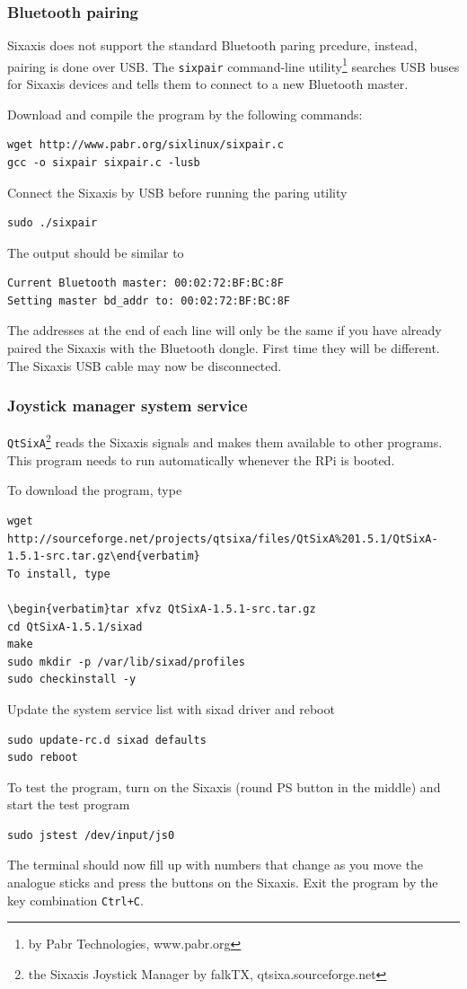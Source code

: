 \subsubsection{Bluetooth pairing}\label{par: Bluetooth-pairing}
Sixaxis does not support the standard Bluetooth paring prcedure, instead, pairing is done over USB. The \texttt{sixpair} command-line utility\footnote{by Pabr Technologies, www.pabr.org} searches USB buses for Sixaxis devices and tells them to connect to a new Bluetooth master.

Download and compile the program by the following commands:
\begin{verbatim}wget http://www.pabr.org/sixlinux/sixpair.c
gcc -o sixpair sixpair.c -lusb\end{verbatim}
Connect the Sixaxis by USB before running the paring utility
\begin{verbatim}sudo ./sixpair\end{verbatim}
The output should be similar to
\begin{verbatim}Current Bluetooth master: 00:02:72:BF:BC:8F
Setting master bd_addr to: 00:02:72:BF:BC:8F\end{verbatim}
The addresses at the end of each line will only be the same if you have already paired the Sixaxis with the Bluetooth dongle. First time they will be different. The Sixaxis USB cable may now be disconnected.

\subsubsection{Joystick manager system service}
\texttt{QtSixA}\footnote{the Sixaxis Joystick Manager by falkTX, qtsixa.sourceforge.net} reads the Sixaxis signals and makes them available to other programs. This program needs to run automatically whenever the RPi is booted.

To download the program, type
\begin{verbatim}wget http://sourceforge.net/projects/qtsixa/files/QtSixA%201.5.1/QtSixA-1.5.1-src.tar.gz\end{verbatim}
To install, type

\begin{verbatim}tar xfvz QtSixA-1.5.1-src.tar.gz
cd QtSixA-1.5.1/sixad
make
sudo mkdir -p /var/lib/sixad/profiles
sudo checkinstall -y\end{verbatim}
Update the system service list with sixad driver and reboot
\begin{verbatim}sudo update-rc.d sixad defaults
sudo reboot\end{verbatim}
To test the program, turn on the Sixaxis (round PS button in the middle) and start the test program
\begin{verbatim}sudo jstest /dev/input/js0\end{verbatim}
The terminal should now fill up with numbers that change as you move the analogue sticks and press the buttons on the Sixaxis. Exit the program by the key combination \texttt{Ctrl+C}.


